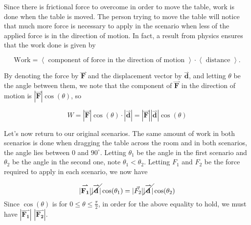 \documentclass{ximera}
\begin{document}
\begin{model}
Since there is frictional force to overcome in order to move the table, work is done when the table is moved.  The person trying to move the table will notice that much more force is necessary to apply in the scenario when less of the applied force is in the direction of motion.  In fact, a result from physics ensures that the work done is given by

\[
\textrm{Work} = \left<\textrm{ component of force in the direction of motion }\right> \cdot \left<\textrm{ distance }\right>.
\]

By denoting the force by $\overset{\boldsymbol{\rightharpoonup}}{\mathbf{F}}$ and the displacement vector by $\overset{\boldsymbol{\rightharpoonup}}{\mathbf{d}}$, and letting $\theta$ be the angle between them, we note that the component of $\overset{\boldsymbol{\rightharpoonup}}{\mathbf{F}}$ in the direction of motion is $|\overset{\boldsymbol{\rightharpoonup}}{\mathbf{F}}|\cos(\theta)$, so 

\[
W = |\overset{\boldsymbol{\rightharpoonup}}{\mathbf{F}}| \cos(\theta) \cdot |\overset{\boldsymbol{\rightharpoonup}}{\mathbf{d}}| = |\overset{\boldsymbol{\rightharpoonup}}{\mathbf{F}}||\overset{\boldsymbol{\rightharpoonup}}{\mathbf{d}}|\cos(\theta)
\]

Let's now return to our original scenarios.  The same amount of work in both scenarios is done when dragging the table across the room and in both scenarios, the angle lies between $0$ and $90^{\circ}$.  Letting $\theta_1$ be the angle in the first scenario and $\theta_2$ be the angle in the second one, note $\theta_1 <\theta_2$.  Letting $F_1$ and $F_2$ be the force required to apply in each scenario, we now have 

\[
|\overset{\boldsymbol{\rightharpoonup}}{\mathbf{F_1}}|\cancel{|\overset{\boldsymbol{\rightharpoonup}}{\mathbf{d}}|}\cos(\theta_1) = |\vec{F_2}|\cancel{|\overset{\boldsymbol{\rightharpoonup}}{\mathbf{d}}|}\cos(\theta_2)
\]
Since $\cos(\theta)$ is  for $0\leq \theta\leq \frac{\pi}{2}$, in order for the above equality to hold,  we must have $|\overset{\boldsymbol{\rightharpoonup}}{\mathbf{F_1}}|$ \wordChoice{\choice[correct]{$<$}\choice{$=$}\choice{$>$}} $|\overset{\boldsymbol{\rightharpoonup}}{\mathbf{F_2}}|$.
\end{model}
\end{document}
